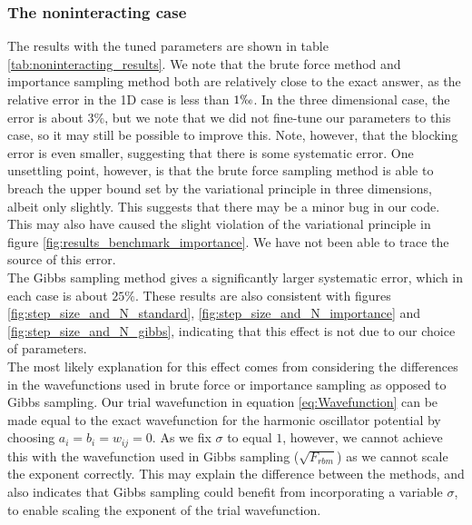 \documentclass[a4paper, 10pt]{article}
\begin{document}
\subsubsection{The noninteracting case}\label{sec:disc_result_noninteracting}
The results with the tuned parameters are shown in table \ref{tab:noninteracting_results}. We note that the brute force method and importance sampling method both are relatively close to the exact answer, as the relative error in the 1D case is less than $1 \permil$. In the three dimensional case, the error is about $3\%$, but we note that we did not fine-tune our parameters to this case, so it may still be possible to improve this. Note, however, that the blocking error is even smaller, suggesting that there is some systematic error. One unsettling point, however, is that the brute force sampling method is able to breach the upper bound set by the variational principle in three dimensions, albeit only slightly. This suggests that there may be a minor bug in our code. This may also have caused the slight violation of the variational principle in figure \ref{fig:results_benchmark_importance}. We have not been able to trace the source of this error.\\
\linebreak
The Gibbs sampling method gives a significantly larger systematic error, which in each case is about $25\%$. These results are also consistent with figures \ref{fig:step_size_and_N_standard}, \ref{fig:step_size_and_N_importance} and \ref{fig:step_size_and_N_gibbs}, indicating that this effect is not due to our choice of parameters.\\
\linebreak
The most likely explanation for this effect comes from considering the differences in the wavefunctions used in brute force or importance sampling as opposed to Gibbs sampling. Our trial wavefunction in equation \ref{eq:Wavefunction} can be made equal to the exact wavefunction for the harmonic oscillator potential by choosing $a_i=b_i=w_{ij}=0$. As we fix $\sigma$ to equal $1$, however, we cannot achieve this with the wavefunction used in Gibbs sampling ($\sqrt{F_{rbm}}$) as we cannot scale the exponent correctly. This may explain the difference between the methods, and also indicates that Gibbs sampling could benefit from incorporating a variable $\sigma$, to enable scaling the exponent of the trial wavefunction.
\end{document}

